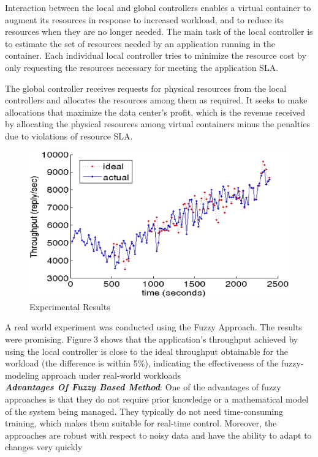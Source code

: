 \documentclass[12pt]{article} %
\begin{document}
Interaction between the local and global controllers enables
a virtual container to augment its resources in response to
increased workload, and to reduce its resources when they
are no longer needed. The main task of the local controller
is to estimate the set of resources needed by an application
running in the container. Each individual local controller tries to minimize the resource
cost by only requesting the resources necessary for meeting the application SLA. 



The global controller receives requests for physical resources from the local controllers and allocates the resources among them as required. It seeks to make allocations that maximize the data center’s profit, which is the revenue received by allocating the physical resources
among virtual containers minus the penalties due to violations of resource SLA.

\begin{figure}[h!]
  \centering
   \includegraphics[scale=0.50]{fuzzy_experiment.png}
  \caption{Experimental Results}
\end{figure}
A real world experiment was conducted using the Fuzzy Approach. The results were promising. Figure 3 shows that the application’s throughput achieved by using the local controller is close to the ideal throughput obtainable for the
workload (the difference is within 5\%), indicating the effectiveness of the fuzzy-modeling approach under real-world
workloads\\
\textbf{\emph{Advantages Of Fuzzy Based Method}}:
One of the advantages of fuzzy approaches is that they do not require prior knowledge or a mathematical model of the system being managed. They typically do not need time-consuming training, which makes them suitable for real-time control. Moreover, the approaches are robust with respect to noisy data and have the ability to adapt to changes very quickly
\end{document}
